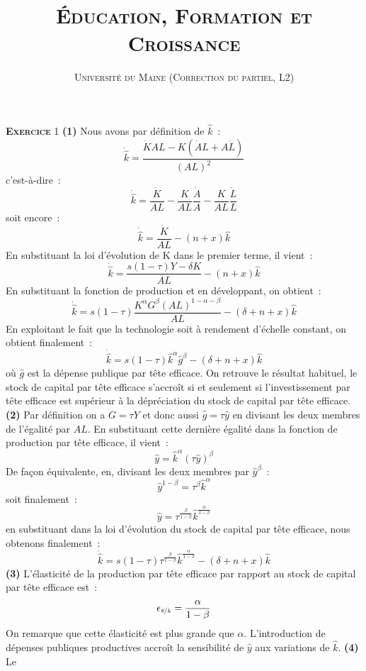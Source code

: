 \documentclass[10pt,a4paper,notitlepage]{article}
\newcommand{\exercice}[1]{\textsc{\textbf{Exercice}} #1}
\newcommand{\question}[1]{\textbf{(#1)}}
\begin{document}
\title{\textsc{Éducation, Formation et Croissance}}
\author{\textsc{Université du Maine (Correction du partiel, L2)}}
\date{}

\maketitle

\exercice{1} \question{1} Nous avons par définition de $\hat{k}$ :
\[
\dot{\hat{k}} = \frac{\dot K A L - K (\dot A L + A \dot L)}{(AL)^2}
\]
c'est-à-dire :
\[
\dot{\hat{k}} = \frac{\dot K}{A L} - \frac{K}{AL}\frac{\dot A}{A} -  \frac{K}{AL}\frac{\dot L}{L}
\]
soit encore :
\[
\dot{\hat{k}} = \frac{\dot K}{A L} - (n+x)\hat{k}
\]
En substituant la loi d'évolution de K dans le premier terme, il vient :
\[
\dot{\hat{k}} = \frac{s (1-\tau)Y - \delta K}{A L} - (n+x)\hat{k}
\]
En substituant la fonction de production et en développant, on obtient :
\[
\dot{\hat{k}} = s (1-\tau)\frac{K^{\alpha}G^{\beta}(AL)^{1-\alpha-\beta}}{A L} - (\delta+n+x)\hat{k}
\]
En exploitant le fait que la technologie soit à rendement d'échelle constant, on obtient finalement :
\[
\dot{\hat{k}} = s (1-\tau)\hat{k}^{\alpha}\hat{g}^{\beta} - (\delta+n+x)\hat{k}
\]
où $\hat{g}$ est la dépense publique par tête efficace. On retrouve le
résultat habituel, le stock de  capital par tête efficace s'accroît si
et seulement si l'investissement par  tête efficace est supérieur à la
dépréciation du stock  de capital par tête  efficace. \question{2} Par
définition on a $G  = \tau Y$ et donc aussi $\hat g  = \tau \hat y$ en
divisant les deux membres de  l'égalité par $AL$. En substituant cette
dernière égalité dans la fonction  de production par tête efficace, il
vient :
\[
\hat y = \hat{k}^{\alpha}\left(\tau \hat{y}\right)^{\beta}
\]
De façon équivalente, en, divisant les deux membres par $\hat{y}^{\beta}$ :
\[
\hat{y}^{1-\beta} = \tau^{\beta}\hat{k}^{\alpha}
\]
soit finalement :
\[
\hat{y} = \tau^{\frac{\beta}{1-\beta}}\hat{k}^{\frac{\alpha}{1-\beta}}
\]
en substituant  dans la loi d'évolution  du stock de capital  par tête
efficace, nous obtenons finalement :
\[
\dot{\hat{k}} = s(1-\tau)\tau^{\frac{\beta}{1-\beta}}\hat{k}^{\frac{\alpha}{1-\beta}} - (\delta+n+x)\hat{k}
\]
\question{3}  L'élasticité  de la  production  par  tête efficace  par
rapport au stock de capital par tête efficace est :
\[
\epsilon_{\nicefrac{\hat y}{\hat k}} = \frac{\alpha}{1-\beta}
\] 
On   remarque    que   cette   élasticité   est    plus   grande   que
$\alpha$. L'introduction de dépenses  publiques productives accroît la
sensibilité de  $\hat y$ aux  variations de $\hat k$.  \question{4} Le
\end{document}
